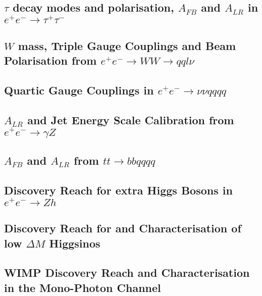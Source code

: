 \subsection{$\tau$ decay modes and polarisation, $A_{FB}$ and $A_{LR}$ in $e^+e^- \to \tau^+\tau^-$}
\subsection{$W$ mass, Triple Gauge Couplings and Beam Polarisation from $e^+e^- \to WW \to qql\nu$}
\subsection{Quartic Gauge Couplings in $e^+e^- \to \nu\nu qqqq$}
\subsection{$A_{LR}$ and Jet Energy Scale Calibration from $e^+e^- \to \gamma Z$}
\subsection{$A_{FB}$ and $A_{LR}$ from $tt \to bb qqqq$}

\subsection{Discovery Reach for extra Higgs Bosons in $e^+e^- \to Zh$}
\subsection{Discovery Reach for and Characterisation of low $\Delta M$ Higgsinos}
\subsection{WIMP Discovery Reach and Characterisation in the Mono-Photon Channel}


